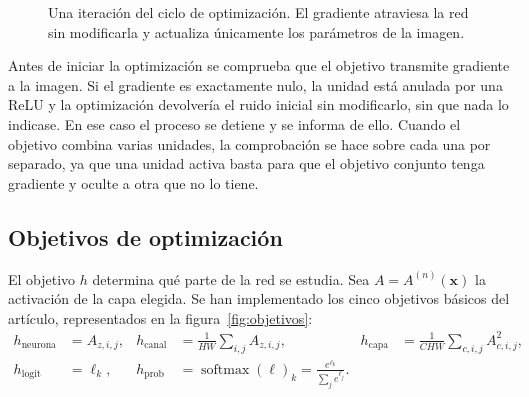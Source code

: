 \documentclass[11pt,a4paper]{article}
\newcommand{\vx}{\mathbf{x}}
\DeclareMathOperator{\softmax}{softmax}
\begin{document}
\begin{figure}[!htb]
\centering
{}
\caption{Una iteración del ciclo de optimización. El gradiente atraviesa la
red sin modificarla y actualiza únicamente los parámetros de la imagen.}
\label{fig:bucle}
\end{figure}

Antes de iniciar la optimización se comprueba que el objetivo transmite
gradiente a la imagen. Si el gradiente es exactamente nulo, la unidad está
anulada por una ReLU y la optimización devolvería el ruido inicial sin
modificarlo, sin que nada lo indicase. En ese caso el proceso se detiene y
se informa de ello. Cuando el objetivo combina varias unidades, la
comprobación se hace sobre cada una por separado, ya que una unidad
activa basta para que el objetivo conjunto tenga gradiente y oculte a otra
que no lo tiene.

\subsection{Objetivos de optimización}
\label{sec:objetivos}

El objetivo $h$ determina qué parte de la red se estudia. Sea
$A = A^{(n)}(\vx)$ la activación de la capa elegida. Se han implementado
los cinco objetivos básicos del artículo, representados en la
figura~\ref{fig:objetivos}:
\begin{align}
h_{\text{neurona}} &= A_{z,i,j}, &
h_{\text{canal}} &= \frac{1}{HW}\sum_{i,j} A_{z,i,j}, &
h_{\text{capa}} &= \frac{1}{CHW}\sum_{c,i,j} A_{c,i,j}^{2},
\label{eq:objetivos}\\
h_{\text{logit}} &= \ell_k, &
h_{\text{prob}} &= \softmax(\boldsymbol{\ell})_k = \frac{e^{\ell_k}}{\sum_{j} e^{\ell_j}}. \nonumber
\end{align}
\end{document}
